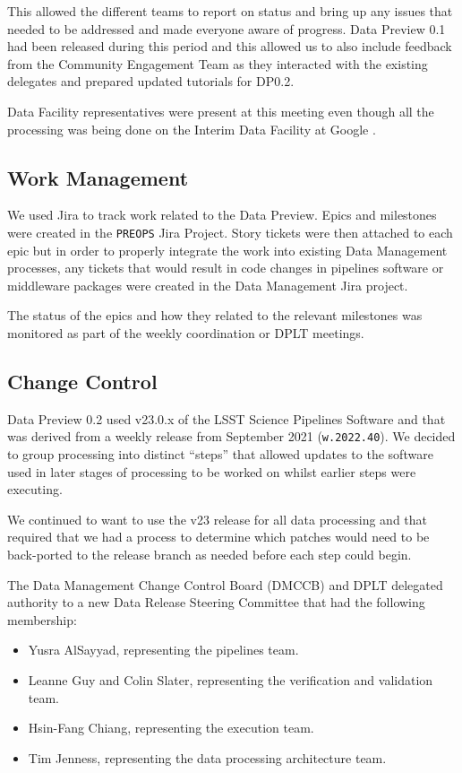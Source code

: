 This allowed the different teams to report on status and bring up any issues that needed to be addressed and made everyone aware of progress.
Data Preview 0.1 had been released during this period and this allowed us to also include feedback from the Community Engagement Team as they interacted with the existing delegates and prepared updated tutorials for DP0.2.

Data Facility representatives were present at this meeting even though all the processing was being done on the Interim Data Facility at Google \citep{2021arXiv211115030O}.

\subsection{Work Management}

We used Jira to track work related to the Data Preview.
Epics and milestones were created in the \texttt{PREOPS} Jira Project.
Story tickets were then attached to each epic but in order to properly integrate the work into existing Data Management processes, any tickets that would result in code changes in pipelines software or middleware packages were created in the Data Management Jira project.

The status of the epics and how they related to the relevant milestones was monitored as part of the weekly coordination or DPLT meetings.

\subsection{Change Control}

Data Preview 0.2 used v23.0.x of the LSST Science Pipelines Software and that was derived from a weekly release from September 2021 (\texttt{w.2022.40}).
We decided to group processing into distinct ``steps'' that allowed updates to the software used in later stages of processing to be worked on whilst earlier steps were executing.

We continued to want to use the v23 release for all data processing and that required that we had a process to determine which patches would need to be back-ported to the release branch as needed before each step could begin.

The Data Management Change Control Board (DMCCB) and DPLT delegated authority to a new Data Release Steering Committee that had the following membership:

\begin{itemize}
\item Yusra AlSayyad, representing the pipelines team.
\item Leanne Guy and Colin Slater, representing the verification and validation team.
\item Hsin-Fang Chiang, representing the execution team.
\item Tim Jenness, representing the data processing architecture team.
\end{itemize}

